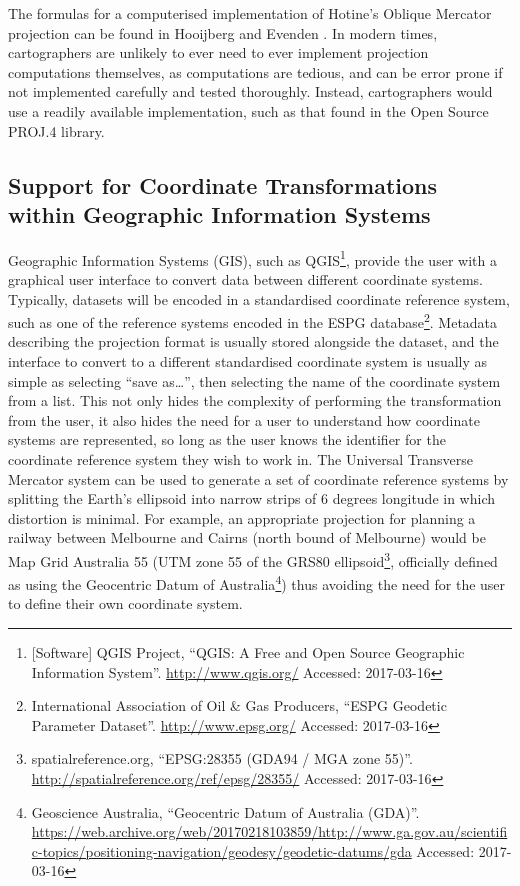The formulas for a computerised implementation of Hotine's Oblique
Mercator projection can be found in Hooijberg \cite{Hooijberg2008} and Evenden \cite{evenden_libproj4_2005}. In modern times, cartographers are
unlikely to ever need to ever implement projection computations
themselves, as computations are tedious, and can be error prone if not
implemented carefully and tested thoroughly. Instead, cartographers
would use a readily available implementation, such as that found in the
Open Source PROJ.4 \cite{evenden_libproj4_2005} library.


\subsection{Support for Coordinate Transformations within Geographic
Information
Systems}\label{support-for-coordinate-transformations-within-geographic-information-systems}

Geographic Information Systems (GIS), such as QGIS\footnote{{[}Software{]}
  QGIS Project, ``QGIS: A Free and Open Source Geographic Information
  System''. \url{http://www.qgis.org/} Accessed: 2017-03-16}, provide the user
with a graphical user interface to convert data between different
coordinate systems. Typically, datasets will be encoded in a
standardised coordinate reference system, such as one of the reference
systems encoded in the ESPG database\footnote{International Association
  of Oil \& Gas Producers, ``ESPG Geodetic Parameter Dataset''.
  \url{http://www.epsg.org/} Accessed: 2017-03-16}. Metadata describing the
projection format is usually stored alongside the dataset, and the
interface to convert to a different standardised coordinate system is
usually as simple as selecting ``save as\ldots{}'', then selecting the
name of the coordinate system from a list. This not only hides the
complexity of performing the transformation from the user, it also hides
the need for a user to understand how coordinate systems are
represented, so long as the user knows the identifier for the coordinate
reference system they wish to work in. The Universal Transverse Mercator
system can be used to generate a set of coordinate reference systems by
splitting the Earth's ellipsoid into narrow strips of 6 degrees longitude in
which distortion is minimal. For example, an appropriate projection for
planning a railway between Melbourne and Cairns (north bound of
Melbourne) would be Map Grid Australia 55 (UTM zone 55 of the GRS80
ellipsoid\footnote{spatialreference.org, ``EPSG:28355 (GDA94 / MGA zone
  55)''. \url{http://spatialreference.org/ref/epsg/28355/} Accessed:
  2017-03-16}, officially defined as using the Geocentric Datum of
Australia\footnote{Geoscience Australia, ``Geocentric Datum of Australia
  (GDA)''.
  \url{https://web.archive.org/web/20170218103859/http://www.ga.gov.au/scientific-topics/positioning-navigation/geodesy/geodetic-datums/gda}
  Accessed: 2017-03-16}) thus avoiding the need for the user to define
their own coordinate system.

